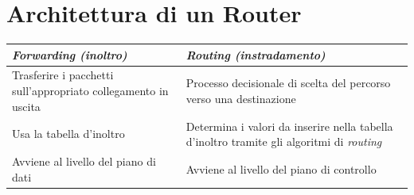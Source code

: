 \section{Architettura di un Router}

\begin{table}[H]
    \centering
    \begin{tabular}{m{15em}|m{15em}}
        \textbf{\emph{Forwarding (inoltro)}}                           & \textbf{\emph{Routing (instradamento)}}                                                        \\
        \hline
        Trasferire i pacchetti sull'appropriato collegamento in uscita & Processo decisionale di scelta del percorso verso una destinazione                             \\
        \hline
        Usa la tabella d'inoltro                                       & Determina i valori da inserire nella tabella d'inoltro tramite gli algoritmi di \emph{routing} \\
        \hline
        Avviene al livello del piano di dati                           & Avviene al livello del piano di controllo                                                      \\
    \end{tabular}
\end{table}

